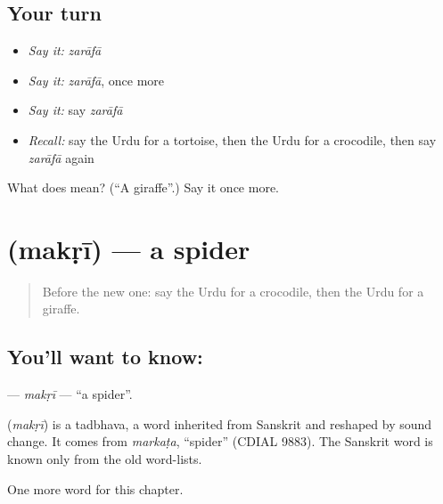 \subsection*{Your turn}
\begin{itemize}
\raggedright
  \item \emph{Say it:} \emph{zarāfā}
  \item \emph{Say it:} \emph{zarāfā}, once more
  \item \emph{Say it:} say \emph{zarāfā}
  \item \emph{Recall:} say the Urdu for a tortoise, then the Urdu for a crocodile, then say \emph{zarāfā} again
\end{itemize}

\begin{tcolorbox}[breakable,colback=teal!4,colframe=teal!35!black,title={Before you move on}]
What does  mean? (\textquotedblleft{}A giraffe\textquotedblright{}.) Say it once more.
\end{tcolorbox}
\section[\texorpdfstring{\ur{مکڑی} (makṛī)}{مکڑی (makṛī)}]{ (makṛī) — a spider}

\label{lesson:UR-C253-makri}



\begin{quote}
Before the new one: say the Urdu for a crocodile, then the Urdu for a giraffe.
\end{quote}

\subsection*{You'll want to know: }
\textbf{} — \emph{makṛī} — \textquotedblleft{}a spider\textquotedblright{}.

\begin{cousinweb}
\textbf{} (\emph{makṛī}) is a tadbhava, a word inherited from Sanskrit and reshaped by sound change. It comes from \emph{markaṭa}, \textquotedblleft{}spider\textquotedblright{} (CDIAL 9883). The Sanskrit word is known only from the old word-lists.
\end{cousinweb}

\begin{grammarlens}[title={What you've built}]
One more word for this chapter.
\end{grammarlens}


